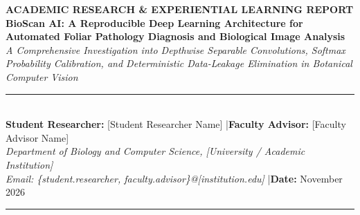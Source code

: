 \documentclass[11pt,a4paper]{article}
\begin{document}
\begin{center}
    {\small\textbf{\textcolor{tealbio}{ACADEMIC RESEARCH \& EXPERIENTIAL LEARNING REPORT}}}\\[0.3cm]
    {\LARGE\textbf{BioScan AI: A Reproducible Deep Learning Architecture for Automated Foliar Pathology Diagnosis and Biological Image Analysis}}\\[0.35cm]
    {\normalsize\textit{A Comprehensive Investigation into Depthwise Separable Convolutions, Softmax Probability Calibration, and Deterministic Data-Leakage Elimination in Botanical Computer Vision}}\\[0.4cm]
    \rule{\textwidth}{0.8pt}\\[0.25cm]
    \textbf{Student Researcher:} [Student Researcher Name] \quad|\quad \textbf{Faculty Advisor:} [Faculty Advisor Name]\\
    \textit{Department of Biology and Computer Science, [University / Academic Institution]}\\
    \textit{Email: \{student.researcher, faculty.advisor\}@[institution.edu]} \quad|\quad \textbf{Date:} November 2026\\
    \rule{\textwidth}{0.4pt}
\end{center}

\vspace{0.2cm}
\end{document}
